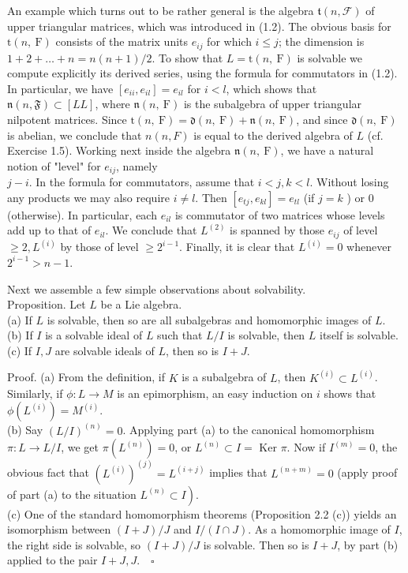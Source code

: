 \documentclass[10pt]{article}
\begin{document}
An example which turns out to be rather general is the algebra $\mathfrak{t}(n, \mathcal{F})$ of upper triangular matrices, which was introduced in (1.2). The obvious basis for $\mathrm{t}(n, \mathrm{~F})$ consists of the matrix units $e_{i j}$ for which $i \leq j$; the dimension is $1+2+\ldots+n=n(n+1) / 2$. To show that $L=\mathrm{t}(n, \mathrm{~F})$ is solvable we compute explicitly its derived series, using the formula for commutators in (1.2). In particular, we have $\left[e_{i i}, e_{i l}\right]=e_{i l}$ for $i<l$, which shows that $\mathfrak{n}(n, \mathfrak{F}) \subset[L L]$, where $\mathfrak{n}(n, \mathrm{~F})$ is the subalgebra of upper triangular nilpotent matrices. Since $\mathrm{t}(n, \mathrm{~F})=\mathfrak{d}(n, \mathrm{~F})+\mathfrak{n}(n, \mathrm{~F})$, and since $\mathfrak{d}(n, \mathrm{~F})$ is abelian, we conclude that $n(n, F)$ is equal to the derived algebra of $L$ (cf. Exercise 1.5). Working next inside the algebra $\mathfrak{n}(n, \mathrm{~F})$, we have a natural notion of "level" for $e_{i j}$, namely\\
$j-i$. In the formula for commutators, assume that $i<j, k<l$. Without losing any products we may also require $i \neq l$. Then $\left[e_{t j}, e_{k l}\right]=e_{t l}$ (if $j=k$ ) or 0 (otherwise). In particular, each $e_{i l}$ is commutator of two matrices whose levels add up to that of $e_{i l}$. We conclude that $L^{(2)}$ is spanned by those $e_{i j}$ of level $\geq 2, L^{(i)}$ by those of level $\geq 2^{i-1}$. Finally, it is clear that $L^{(i)}=0$ whenever $2^{i-1}>n-1$.

Next we assemble a few simple observations about solvability.\\
Proposition. Let $L$ be a Lie algebra.\\
(a) If $L$ is solvable, then so are all subalgebras and homomorphic images of $L$.\\
(b) If $I$ is a solvable ideal of $L$ such that $L / I$ is solvable, then $L$ itself is solvable.\\
(c) If $I, J$ are solvable ideals of $L$, then so is $I+J$.

Proof. (a) From the definition, if $K$ is a subalgebra of $L$, then $K^{(i)} \subset L^{(i)}$. Similarly, if $\phi: L \rightarrow M$ is an epimorphism, an easy induction on $i$ shows that $\phi\left(L^{(i)}\right)=M^{(i)}$.\\
(b) Say $(L / I)^{(n)}=0$. Applying part (a) to the canonical homomorphism $\pi: L \rightarrow L / I$, we get $\pi\left(L^{(n)}\right)=0$, or $L^{(n)} \subset I=$ Ker $\pi$. Now if $I^{(m)}=0$, the obvious fact that $\left(L^{(i)}\right)^{(j)}=L^{(i+j)}$ implies that $L^{(n+m)}=0$ (apply proof of part (a) to the situation $\left.L^{(n)} \subset I\right)$.\\
(c) One of the standard homomorphism theorems (Proposition 2.2 (c)) yields an isomorphism between $(I+J) / J$ and $I /(I \cap J)$. As a homomorphic image of $I$, the right side is solvable, so $(I+J) / J$ is solvable. Then so is $I+J$, by part (b) applied to the pair $I+J, J . \quad \square$
\end{document}
